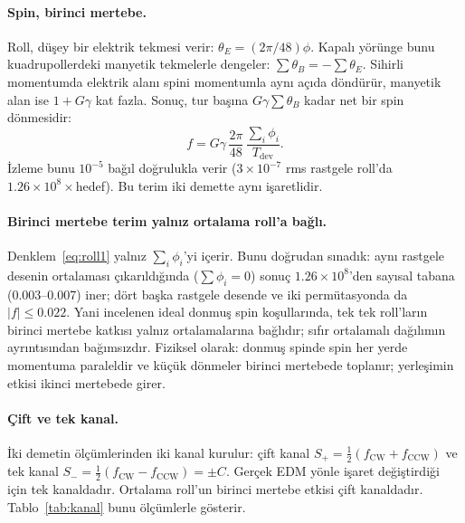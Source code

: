 \documentclass[11pt,a4paper]{article}
\begin{document}
\paragraph{Spin, birinci mertebe.} Roll, düşey bir elektrik tekmesi verir: $\theta_E=(2\pi/48)\phi$. Kapalı
yörünge bunu kuadrupollerdeki manyetik tekmelerle dengeler: $\sum\theta_B=-\sum\theta_E$. Sihirli momentumda
elektrik alanı spini momentumla aynı açıda döndürür, manyetik alan ise $1+G\gamma$ kat fazla. Sonuç, tur başına
$G\gamma\sum\theta_B$ kadar net bir spin dönmesidir:
\begin{equation}
f=G\gamma\,\frac{2\pi}{48}\,\frac{\sum_i\phi_i}{T_\text{dev}}.
\label{eq:roll1}
\end{equation}
İzleme bunu $10^{-5}$ bağıl doğrulukla verir ($3\times10^{-7}$ rms rastgele roll'da $1.26\times10^8\times$hedef).
Bu terim iki demette aynı işaretlidir.

\paragraph{Birinci mertebe terim yalnız ortalama roll'a bağlı.} Denklem~\eqref{eq:roll1} yalnız $\sum_i\phi_i$'yi
içerir. Bunu doğrudan sınadık: aynı rastgele desenin ortalaması çıkarıldığında ($\sum\phi_i=0$) sonuç
$1.26\times10^8$'den sayısal tabana (0.003--0.007) iner; dört başka rastgele desende ve iki permütasyonda da
$|f|\le0.022$. Yani incelenen ideal donmuş spin koşullarında, tek tek roll'ların birinci mertebe katkısı yalnız
ortalamalarına bağlıdır; sıfır ortalamalı dağılımın ayrıntısından bağımsızdır. Fiziksel olarak: donmuş spinde spin
her yerde momentuma paraleldir ve küçük dönmeler birinci mertebede toplanır; yerleşimin etkisi ikinci mertebede
girer.

\paragraph{Çift ve tek kanal.} İki demetin ölçümlerinden iki kanal kurulur: çift kanal
$S_+=\tfrac12(f_\text{CW}+f_\text{CCW})$ ve tek kanal $S_-=\tfrac12(f_\text{CW}-f_\text{CCW})=\pm C$. Gerçek EDM
yönle işaret değiştirdiği için tek kanaldadır. Ortalama roll'un birinci mertebe etkisi çift kanaldadır.
Tablo~\ref{tab:kanal} bunu ölçümlerle gösterir.
\end{document}
